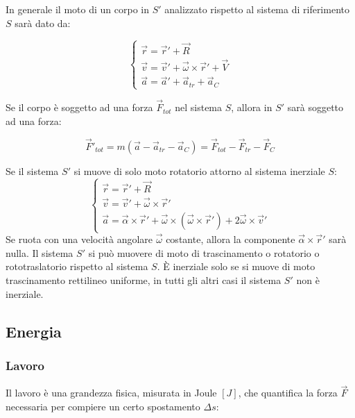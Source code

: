\documentclass{article}
\numberwithin{equation}{subsection}
\begin{document}
In generale il moto di un corpo in $S'$ analizzato rispetto al sistema 
di riferimento $S$ sarà dato da:

\begin{equation}
    \begin{cases}
        \vec{r}=\vec{r}'+\vec{R}\\
        \vec{v}=\vec{v}'+\vec{\omega}\times\vec{r}'+\vec{V}\\
        \vec{a}=\vec{a}'+\vec{a}_{tr}+\vec{a}_C
    \end{cases}
\end{equation}
    
Se il corpo è soggetto ad una forza $\vec{F}_{tot}$ nel 
sistema $S$, allora in $S'$ sarà soggetto ad una forza: 

\begin{equation}
    \vec{F}'_{tot}=m(\vec{a}-\vec{a}_{tr}-\vec{a}_C)=\vec{F}_{tot}-\vec{F}_{tr}-\vec{F}_C
\end{equation}



Se il sistema $S'$ si muove di solo moto rotatorio attorno al sistema inerziale $S$:
\begin{equation}
    \begin{cases}
        \vec{r}=\vec{r}'+\vec{R}\\
        \vec{v}=\vec{v}'+\vec{\omega}\times\vec{r}'\\
        \vec{a}=\vec{\alpha}\times\vec{r}'+\vec{\omega}\times(\vec{\omega}\times\vec{r}')+2\vec{\omega}\times\vec{v}'
    \end{cases}
\end{equation}
Se ruota con una velocità angolare $\vec{\omega}$ costante, allora la componente $\vec{\alpha}\times\vec{r}'$ sarà nulla. 
Il sistema $S'$ si può muovere di moto di trascinamento o rotatorio  o rototraslatorio rispetto al sistema $S$. \`{E} inerziale solo se si muove di moto trascinamento rettilineo uniforme, in 
tutti gli altri casi il sistema $S'$ non è inerziale. 

\subsection{Energia}

\subsubsection{Lavoro}
Il lavoro è una grandezza fisica, misurata in Joule $\left[J\right]$, che quantifica la forza $\vec{F}$
necessaria per compiere un certo spostamento $\Delta s$: 
\end{document}
